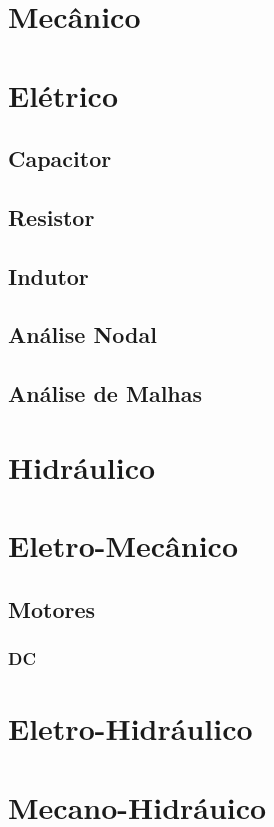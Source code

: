 \documentclass[a4paper, 12pt]{book}
\begin{document}
\chapter{Mecânico}
\chapter{Elétrico}

\section{Capacitor}
\section{Resistor}
\section{Indutor}
\section{Análise Nodal}
\section{Análise de Malhas}

\chapter{Hidráulico}
\chapter{Eletro-Mecânico}

\section{Motores}
\subsection{DC}

 



\chapter{Eletro-Hidráulico}
\chapter{Mecano-Hidráuico}
\end{document}
